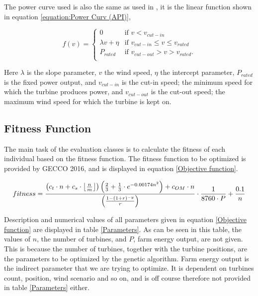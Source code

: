 \noindent The power curve used is also the same as used in \cite{Kusiak}, it is the linear function shown in equation \ref{equation:Power Curv (API)},

\begin{equation}
 f(v) = 
  \begin{cases} 
   0                                  & \text{if }     v < v_{cut-in} \\
   \lambda v + \eta           & \text{if }     v_{cut-in} \leq v \leq v_{rated} \\
   P_{rated}                        & \text{if }     v_{cut-out} > v > v_{rated}. \\
  \end{cases}
  \label{equation:Power Curv (API)}
\end{equation}

\noindent Here $\lambda$ is the slope parameter, $v$ the wind speed, $\eta$ the intercept parameter, $P_{rated}$ is the fixed power output, and $v_{cut-in}$ is the cut-in speed; the minimum speed for which the turbine produces power, and $v_{cut-out}$ is the cut-out speed; the maximum wind speed for which the turbine is kept on. 


\subsection{Fitness Function}\label{subsection:fitness function}
The main task of the evaluation classes is to calculate the fitness of each individual based on the fitness function.  The fitness function to be optimized is provided by GECCO 2016, and is displayed in equation \ref{Objective function}.\\

\begin{small}
\begin{equation}
fitness =  \frac{ \left( c_t \cdot n + c_s \cdot \floor*{\frac{n}{m}} \right) \left( \frac{2}{3} + \frac{1}{3} \cdot e^{-0.00174n^2} \right) + c_{OM} \cdot n}{\left( \frac{1 - (1 + r)^{-y}}{r} \right) } \cdot \frac{1}{8760 \cdot P} + \frac{0.1}{n}
\label{Objective function} 
\end{equation}
\end{small}


\noindent Description and numerical values of all parameters given in equation \ref{Objective function} are displayed in table \ref{Parameters}. As can be seen in this table, the values of $n$, the number of turbines, and $P$, farm energy output, are not given. This is because the number of turbines, together with the turbine positions, are the parameters to be optimized by the genetic algorithm. Farm energy output is the indirect parameter that we are trying to optimize. It is dependent on turbines count, position, wind scenario and so on, and is off course therefore not provided in table \ref{Parameters} either.\\


